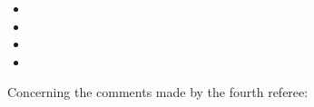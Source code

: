\documentclass[11pt,a4paper,sans]{moderncv}        %
\begin{document}
\begin{itemize}
	\item 
	
	\item 
	
	\item 
	
	\item 
\end{itemize}



 
Concerning the comments made by the fourth referee:
\end{document}
